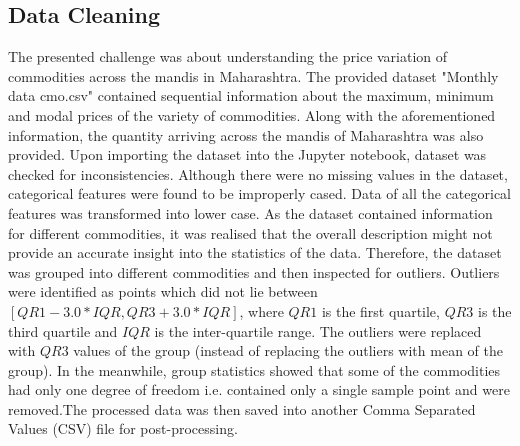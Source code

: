 \documentclass{article}
\begin{document}
\subsection{Data Cleaning}
The presented challenge was about understanding the price variation of commodities across the mandis in Maharashtra. The provided dataset "Monthly data cmo.csv" contained sequential information about the maximum, minimum and modal prices of the variety of commodities. Along with the aforementioned information, the quantity arriving across the mandis of Maharashtra was also provided. Upon importing the dataset into the Jupyter notebook, dataset was checked for inconsistencies. Although there were no missing values in the dataset, categorical features were found to be improperly cased. Data of all the categorical features was transformed into lower case. As the dataset contained information for different commodities, it was realised that the overall description might not provide an accurate insight into the statistics of the data. Therefore, the dataset was grouped into different commodities and then inspected for outliers. Outliers were identified as points which did not lie between $[QR1-3.0*IQR, QR3+3.0*IQR]$, where $QR1$ is the first quartile, $QR3$ is the third quartile and $IQR$ is the inter-quartile range. The outliers were replaced with $QR3$ values of the group (instead of replacing the outliers with mean of the group). In the meanwhile, group statistics showed that some of the commodities had only one degree of freedom i.e. contained only a single sample point and were removed.The processed data was then saved into another Comma Separated Values (CSV) file for post-processing.
\end{document}
